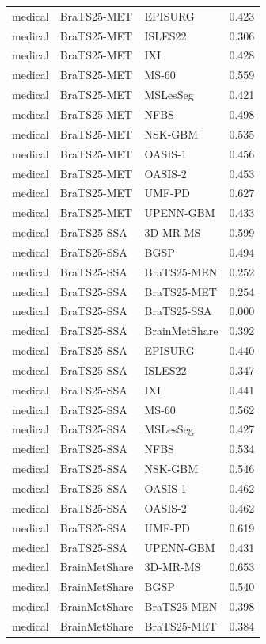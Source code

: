 \begin{tabular}{lllr}
medical & BraTS25-MET & EPISURG & 0.423 \\
medical & BraTS25-MET & ISLES22 & 0.306 \\
medical & BraTS25-MET & IXI & 0.428 \\
medical & BraTS25-MET & MS-60 & 0.559 \\
medical & BraTS25-MET & MSLesSeg & 0.421 \\
medical & BraTS25-MET & NFBS & 0.498 \\
medical & BraTS25-MET & NSK-GBM & 0.535 \\
medical & BraTS25-MET & OASIS-1 & 0.456 \\
medical & BraTS25-MET & OASIS-2 & 0.453 \\
medical & BraTS25-MET & UMF-PD & 0.627 \\
medical & BraTS25-MET & UPENN-GBM & 0.433 \\
medical & BraTS25-SSA & 3D-MR-MS & 0.599 \\
medical & BraTS25-SSA & BGSP & 0.494 \\
medical & BraTS25-SSA & BraTS25-MEN & 0.252 \\
medical & BraTS25-SSA & BraTS25-MET & 0.254 \\
medical & BraTS25-SSA & BraTS25-SSA & 0.000 \\
medical & BraTS25-SSA & BrainMetShare & 0.392 \\
medical & BraTS25-SSA & EPISURG & 0.440 \\
medical & BraTS25-SSA & ISLES22 & 0.347 \\
medical & BraTS25-SSA & IXI & 0.441 \\
medical & BraTS25-SSA & MS-60 & 0.562 \\
medical & BraTS25-SSA & MSLesSeg & 0.427 \\
medical & BraTS25-SSA & NFBS & 0.534 \\
medical & BraTS25-SSA & NSK-GBM & 0.546 \\
medical & BraTS25-SSA & OASIS-1 & 0.462 \\
medical & BraTS25-SSA & OASIS-2 & 0.462 \\
medical & BraTS25-SSA & UMF-PD & 0.619 \\
medical & BraTS25-SSA & UPENN-GBM & 0.431 \\
medical & BrainMetShare & 3D-MR-MS & 0.653 \\
medical & BrainMetShare & BGSP & 0.540 \\
medical & BrainMetShare & BraTS25-MEN & 0.398 \\
medical & BrainMetShare & BraTS25-MET & 0.384 \\

\end{tabular}
